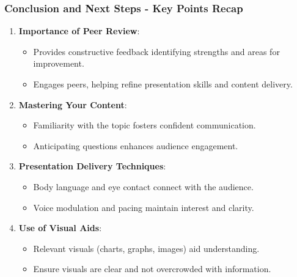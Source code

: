 \documentclass{beamer}
\begin{document}
\begin{frame}[fragile]
    \frametitle{Conclusion and Next Steps - Key Points Recap}
    \begin{enumerate}
        \item \textbf{Importance of Peer Review}:
        \begin{itemize}
            \item Provides constructive feedback identifying strengths and areas for improvement.
            \item Engages peers, helping refine presentation skills and content delivery.
        \end{itemize}
        
        \item \textbf{Mastering Your Content}:
        \begin{itemize}
            \item Familiarity with the topic fosters confident communication.
            \item Anticipating questions enhances audience engagement.
        \end{itemize}
        
        \item \textbf{Presentation Delivery Techniques}:
        \begin{itemize}
            \item Body language and eye contact connect with the audience.
            \item Voice modulation and pacing maintain interest and clarity.
        \end{itemize}
        
        \item \textbf{Use of Visual Aids}:
        \begin{itemize}
            \item Relevant visuals (charts, graphs, images) aid understanding.
            \item Ensure visuals are clear and not overcrowded with information.
        \end{itemize}
    \end{enumerate}
\end{frame}
\end{document}
